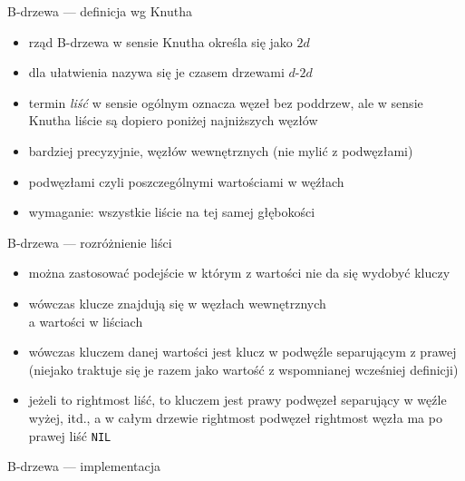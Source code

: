 \documentclass{beamer}
\begin{document}
\begin{frame}{B-drzewa --- definicja wg Knutha}
	\begin{itemize}
    	\item rząd B-drzewa w sensie Knutha określa się jako $2d$
        \item dla ułatwienia nazywa się je czasem drzewami $d$-$2d$
        \pause
        \item termin \textit{liść} w sensie ogólnym oznacza
        węzeł bez poddrzew, ale w sensie Knutha liście są dopiero
        poniżej najniższych węzłów
        \item bardziej precyzyjnie, węzłów wewnętrznych
        (nie mylić z podwęzłami)
        \item podwęzłami czyli poszczególnymi wartościami w węźłach
        \vskip 0.3cm
        \pause
        \item wymaganie: wszystkie liście na tej samej głębokości
    \end{itemize}
\end{frame}

\begin{frame}{B-drzewa --- rozróżnienie liści}
\begin{itemize}
\item można zastosować podejście w którym z wartości nie da się
wydobyć kluczy
\item wówczas klucze znajdują się w węzłach wewnętrznych\\
a wartości w liściach
\item wówczas kluczem danej wartości jest klucz w podwęźle separującym z prawej (niejako traktuje się je razem jako wartość z wspomnianej wcześniej definicji)
\item jeżeli to rightmost liść, to kluczem jest prawy podwęzeł separujący w węźle wyżej, itd., a w całym drzewie rightmost podwęzeł rightmost węzła ma po prawej liść \texttt{NIL}
\end{itemize}
\end{frame}

\begin{frame}{B-drzewa --- implementacja}
\begin{minipage}[t]{0.48\linewidth}
	\inputminted{c}{bdrzewa-impl1.c}
\end{minipage}
\begin{minipage}[t]{0.48\linewidth}
	\inputminted{c}{bdrzewa-impl2.c}
\end{minipage}
\end{frame}

\begin{frame}
	\inputminted{c}{bdrzewa-traversalstru.c}
\end{frame}
\begin{frame}
	\inputminted[tabsize=4]{c}{bdrzewa-traverse.c}
\end{frame}
\begin{frame}
	\inputminted[tabsize=4]{c}{bdrzewa-trawalk.c}
\end{frame}
\end{document}
